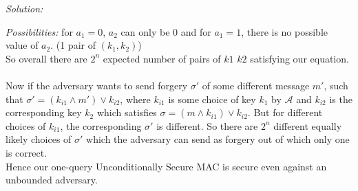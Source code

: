 \documentclass[a4paper, 11pt]{article}
\newenvironment{solution}
    {\textit{Solution:}}
    {\clearpage}
\newcommand{\calA}{\mathcal{A}}
\begin{document}
\begin{solution}
\begin{enumerate}[(a)]
        \textit{Possibilities:} for $a_1 = 0$, $a_2$ can only be 0 and for $a_1 = 1$, there is no possible value of $a_2$. (1 pair of $(k_1, k_2)$)\\
        So overall there are $2^n$ expected number of pairs of $k1$  $k2$ satisfying our equation. \\ \\ 
        Now if the adversary wants to send forgery $\sigma'$ of some different message $m'$, such that $\sigma' = (k_{i1} \wedge m') \vee k_{i2}$, where $k_{i1}$ is some choice of key $k_1$ by $\calA$ and $k_{i2}$ is the corresponding key $k_2$ which satisfies $\sigma = (m \wedge k_{i1}) \vee k_{i2}$. But for different choices of $k_{i1}$, the corresponding $\sigma'$ is different. So there are $2^n$ different equally likely choices of $\sigma'$ which the adversary can send as forgery out of which only one is correct.\\
        Hence our one-query Unconditionally Secure MAC is secure even against an unbounded adversary.


\end{enumerate}
\end{solution}
\end{document}
